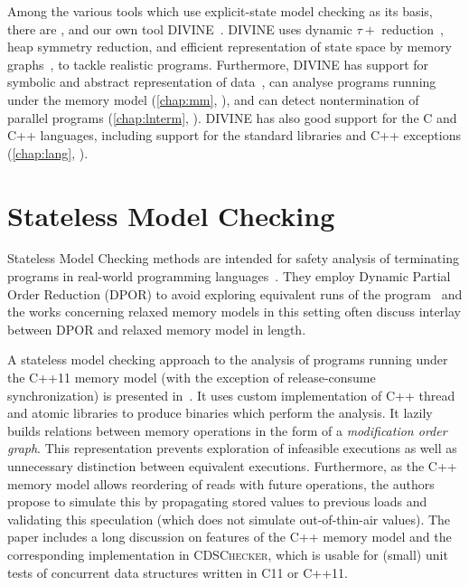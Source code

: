 Among the various tools which use explicit-state model checking as its basis,
there are , and our own tool DIVINE~\cite{DIVINEToolPaper2017}.
DIVINE uses dynamic $\tau+$ reduction~\cite{TODO}, heap symmetry reduction, and
efficient representation of state space by memory graphs~\cite{RSCB2018}, to
tackle realistic programs.
Furthermore, DIVINE has support for symbolic and abstract representation of
data~\cite{TODO}, can analyse programs running under the \xtso memory model
(\autoref{chap:mm}, \cite{SB2018x86tso}), and can detect nontermination of
parallel programs (\autoref{chap:lnterm}, \cite{SB2019}).
DIVINE has also good support for the C and C++ languages, including support for
the standard libraries and C++ exceptions (\autoref{chap:lang},
\cite{SRB2017}).

\section{Stateless Model Checking}


Stateless Model Checking methods are intended for safety analysis of
terminating programs in real-world programming languages~\cite{Godefroid1997}. They employ Dynamic Partial Order Reduction (DPOR)
to avoid exploring equivalent runs of the program~\cite{Flanagan2005dpor} and the works concerning relaxed memory models
in this setting often discuss interlay between DPOR and relaxed memory
model in length.

A stateless model checking approach to the analysis of programs running
under the C++11 memory model (with the exception of release-consume
synchronization) is presented in~\cite{Norris2013}. It uses custom
implementation of C++ thread and atomic libraries to produce binaries
which perform the analysis. It lazily builds relations between memory
operations in the form of a \emph{modification order graph}. This
representation prevents exploration of infeasible executions as well as
unnecessary distinction between equivalent executions. Furthermore, as
the C++ memory model allows reordering of reads with future operations,
the authors propose to simulate this by propagating stored values to
previous loads and validating this speculation (which does not simulate
out-of-thin-air values). The paper includes a long discussion on
features of the C++ memory model and the corresponding implementation in
\textsc{CDSChecker}, which is usable for (small) unit tests of
concurrent data structures written in C11 or C++11.

